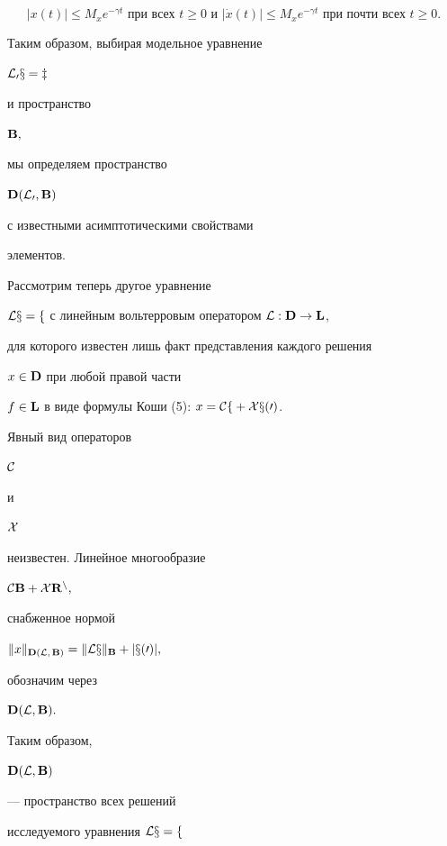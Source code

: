$$


|x(t)| \le M_x e^{-\gamma t}


\text{ при всех } t \ge 0 \text{ и }


|\Dot x (t)| \le M_x e^{-\gamma t} \text{ при почти всех } t\ge 0.


$$





Таким образом, выбирая модельное уравнение


$\cal L_0x = z$


и пространство


$\bold B,$


мы определяем пространство


$\bold D(\cal L_0,\bold B)$


с известными асимптотическими свойствами


элементов.





Рассмотрим теперь другое уравнение


$\cal Lx = f$ с линейным вольтерровым оператором $\cal L:\spc D\to


\spc L$,


для которого известен лишь факт представления каждого решения


$x\in\bold D$ при любой правой части


$f\in\bold L$ в виде формулы Коши (5): $x = \cal C f + \cal X x(0)$.


Явный вид операторов


$\cal C$


и


$\cal X$


неизвестен. Линейное многообразие


$\cal C\bold B+\cal X\bold R^n,$


снабженное нормой


$\| x\|_{\bold D(\cal L,\,\bold B)}=


\|\cal L x\|_{\bold B} + |x(0)|,$


обозначим через


$\bold D(\cal L,\bold B).$





Таким образом,


$\bold D(\cal L,\bold B)$


--- пространство всех решений


исследуемого уравнения $\cal Lx = f$



